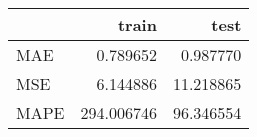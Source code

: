 \begin{tabular}{lrr}
\toprule
{} &       train &       test \\
\midrule
MAE  &    0.789652 &   0.987770 \\
MSE  &    6.144886 &  11.218865 \\
MAPE &  294.006746 &  96.346554 \\
\bottomrule
\end{tabular}
